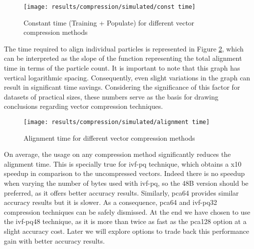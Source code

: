 \documentclass[../main.tex]{subfiles}
\begin{document}
\begin{figure}[htbp]
    \centering
    \texttt{[image: results/compression/simulated/const time]}
    \caption{Constant time (Training + Populate) for different vector compression methods}
    \label{fig:5:compression_constant}
\end{figure}

The time required to align individual particles is represented in Figure \ref{fig:5:compression_alignment}, which can be interpreted as the slope of the function representing the total alignment time in terms of the particle count. It is important to note that this graph has vertical logarithmic spacing. Consequently, even slight variations in the graph can result in significant time savings. Considering the significance of this factor for datasets of practical sizes, these numbers serve as the basis for drawing conclusions regarding vector compression techniques.

\begin{figure}[htbp]
    \centering
    \texttt{[image: results/compression/simulated/alignment time]}
    \caption{Alignment time for different vector compression methods}
    \label{fig:5:compression_alignment}
\end{figure}

On average, the usage on any compression method significantly reduces the alignment time. This is specially true for \gls{ivf}-\gls{pq} technique, which obtains a x10 speedup in comparison to the uncompressed vectors. Indeed there is no speedup when varying the number of bytes used with \gls{ivf}-\gls{pq}, so the 48B version should be preferred, as it offers better accuracy results. Similarly, \gls{pca}64 provides similar accuracy results but it is slower. As a consequence, \gls{pca}64 and \gls{ivf}-\gls{pq}32 compression techniques can be safely dismissed. At the end we have chosen to use the \gls{ivf}-\gls{pq}48 technique, as it is more than twice as fast as the \gls{pca}128 option at a slight accuracy cost. Later we will explore options to trade back this performance gain with better accuracy results.
\end{document}
